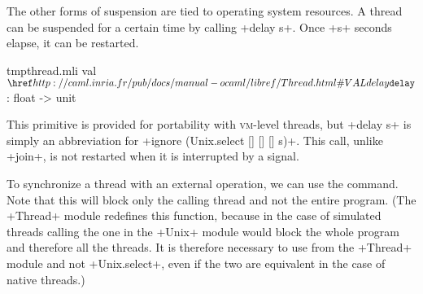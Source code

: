 The other forms of suspension are tied to operating system resources.
A thread can be suspended for a certain time by calling \ml+delay s+.
Once \ml+s+ seconds elapse, it can be restarted.
%
\begin{listingcodefile}{tmpthread.mli}
val $\indexlibvalue{Thread}{delay}$ : float -> unit
\end{listingcodefile}
%
This primitive is provided for portability with \textsc{vm}-level threads, but
\ml+delay s+ is simply an abbreviation for
\ml+ignore (Unix.select [] [] [] s)+. This call, unlike \ml+join+, is
not restarted when it is interrupted by a signal.


To synchronize a thread with an external operation, we can use the
 command. Note that this will block only the
calling thread and not the entire program.  (The \ml+Thread+ module
redefines this function, because in the case of simulated threads
calling the one in the \ml+Unix+ module would block the whole program
and therefore all the threads.  It is therefore necessary to use
 from the \ml+Thread+ module and not
\ml+Unix.select+, even if the two are equivalent in the case of native
threads.)

